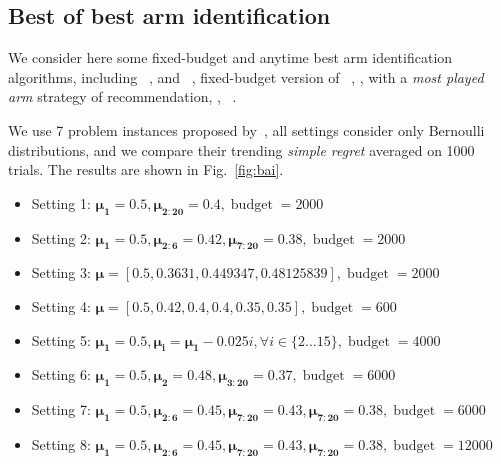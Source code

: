 \documentclass[twoside,11pt]{article}
\begin{document}
\subsection{Best of best arm identification}

We consider here some fixed-budget and anytime best arm identification algorithms, including \Uniform~\citep{bubeck2009pure}, \UCBE and \SR~\citep{audibert2010budget}, fixed-budget version of \UGapE~\citep{gabillon2012ugape},  \SHA, \TS with a \emph{most played arm} strategy of recommendation, \TTTS, \ATLUCB~\citep{jun2016atlucb}.

We use 7 problem instances proposed by~\cite{audibert2010budget}, all settings consider only Bernoulli distributions, and we compare their trending \emph{simple regret} averaged on 1000 trials. The results are shown in Fig.~\ref{fig:bai}.

\begin{itemize}
	\item Setting 1: $\mathbf{\mu_1}=0.5, \mathbf{\mu_{2:20}}=0.4, \operatorname{budget}=2000$
	\item Setting 2: $\mathbf{\mu_1}=0.5, \mathbf{\mu_{2:6}}=0.42, \mathbf{\mu_{7:20}}=0.38, \operatorname{budget}=2000$
	\item Setting 3: $\mathbf{\mu}=[0.5, 0.3631, 0.449347, 0.48125839], \operatorname{budget}=2000$
	\item Setting 4: $\mathbf{\mu}=[0.5, 0.42, 0.4, 0.4, 0.35, 0.35], \operatorname{budget}=600$
	\item Setting 5: $\mathbf{\mu_1}=0.5, \mathbf{\mu_i}=\mathbf{\mu_1}-0.025i, \forall i\in\{2\ldots15\}, \operatorname{budget}=4000$
	\item Setting 6: $\mathbf{\mu_1}=0.5, \mathbf{\mu_2}=0.48, \mathbf{\mu_{3:20}}=0.37, \operatorname{budget}=6000$
	\item Setting 7: $\mathbf{\mu_1}=0.5, \mathbf{\mu_{2:6}}=0.45, \mathbf{\mu_{7:20}}=0.43, \mathbf{\mu_{7:20}}=0.38, \operatorname{budget}=6000$
	\item Setting 8: $\mathbf{\mu_1}=0.5, \mathbf{\mu_{2:6}}=0.45, \mathbf{\mu_{7:20}}=0.43, \mathbf{\mu_{7:20}}=0.38, \operatorname{budget}=12000$
\end{itemize}
\end{document}
